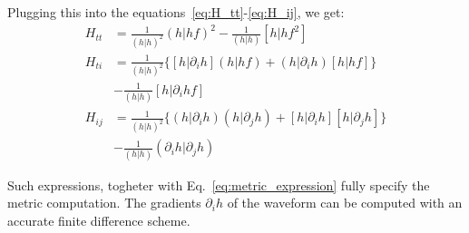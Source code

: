 \documentclass[twocolumn,showpacs,preprintnumbers,nofootinbib,prd,
superscriptaddress,10pt]{revtex4-2}
\renewcommand{\d}[1]{\ensuremath{\operatorname{d}\!{#1}}}
\newcommand{\rescalar}[2]{( #1|#2 )}
\newcommand{\imscalar}[2]{[ #1|#2 ]}
\begin{document}
Plugging this into the equations~\eqref{eq:H_tt}-\eqref{eq:H_ij}, we get:
\begin{align}
	H_{tt} &= \frac{1}{\rescalar{h}{h}^{2}} \rescalar{{h}}{{h}f}^2 - \frac{1}{\rescalar{h}{h}} \imscalar{h}{{h} f^2 } \label{eq:H_tt_grad} \\
	H_{ti} &= \frac{1}{\rescalar{h}{h}^{2}} \Big\{ \imscalar{h}{\partial_i {h}} \rescalar{{h}}{{h}f} +\rescalar{h}{\partial_i {h}} \imscalar{h}{hf} \Big\} \nonumber \\
	&- \frac{1}{\rescalar{h}{h}} \imscalar{h}{\partial_i{h} f } \label{eq:H_ti_grad} \\
	H_{ij} &=  \frac{1}{\rescalar{h}{h}^{2}} \Big\{ \rescalar{h}{\partial_i {h}} \rescalar{{h}}{\partial_j {h}} +\imscalar{h}{\partial_i {h}} \imscalar{h}{\partial_j {h}} \Big\} \nonumber \\
	&- \frac{1}{\rescalar{h}{h}} \rescalar{\partial_i h}{\partial_j {h}} \label{eq:H_ij_grad} 
\end{align}

Such expressions, togheter with Eq.~\eqref{eq:metric_expression} fully specify the metric computation.
The gradients $\partial_i h$ of the waveform can be computed with an accurate finite difference scheme.





	
	
\end{document}
